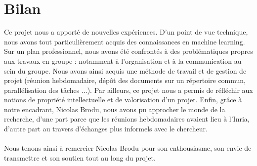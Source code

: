 \documentclass[a4paper,10pt]{article}
\begin{document}
\section{Bilan}

Ce projet nous a apporté de nouvelles expériences. D'un point de vue technique, nous avons tout particulièrement acquis des connaissances en machine learning. Sur un plan professionnel, nous avons été confrontés à des problématiques propres aux travaux en groupe : notamment à l’organisation et à la communication au sein du groupe. Nous avons ainsi acquis une méthode de travail et de gestion de projet (réunion hebdomadaire, dépôt des documents sur un répertoire commun, parallélisation des tâches ...). Par ailleurs, ce projet nous a permis de réfléchir aux notions de propriété intellectuelle et de valorisation d’un projet. Enfin, grâce à notre encadrant, Nicolas Brodu, nous avons pu approcher le monde de la recherche, d’une part parce que les réunions hebdomadaires avaient lieu à l’Inria, d’autre part au travers d'échanges plus informels avec le chercheur.

\paragraph{}
Nous tenons ainsi à remercier Nicolas Brodu pour son enthousiasme, son envie de transmettre et son soutien tout au long du projet.

\newpage


\end{document}
